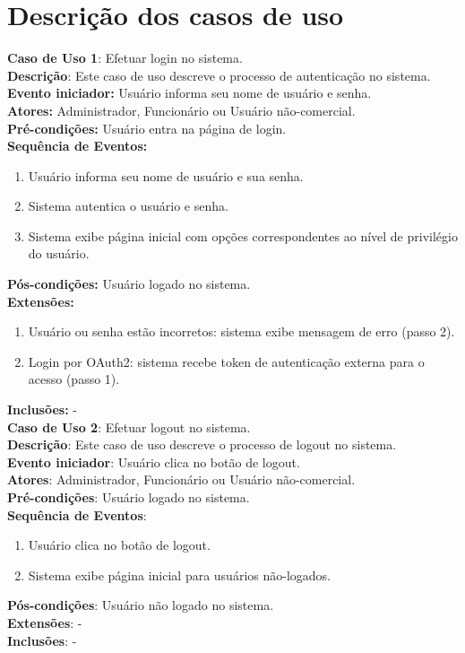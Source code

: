 \documentclass[]{politex}
\begin{document}
\section{Descrição dos casos de uso}

\noindent \textbf{Caso de Uso 1}: Efetuar login no sistema. \\
\textbf{Descrição}: Este caso de uso descreve o processo de autenticação no sistema. \\
\textbf{Evento iniciador:} Usuário informa seu nome de usuário e senha. \\
\textbf{Atores:} Administrador, Funcionário ou Usuário não-comercial. \\
\textbf{Pré-condições:} Usuário entra na página de login. \\
\textbf{Sequência de Eventos:}
\begin{enumerate}
\item Usuário informa seu nome de usuário e sua senha.
\item Sistema autentica o usuário e senha.
\item Sistema exibe página inicial com opções correspondentes ao nível de privilégio do usuário.
\end{enumerate}
\textbf{Pós-condições:} Usuário logado no sistema. \\
\textbf{Extensões:} 
\begin{enumerate}
\item Usuário ou senha estão incorretos: sistema exibe mensagem de erro (passo 2).
\item Login por OAuth2: sistema recebe token de autenticação externa para o acesso (passo 1). 
\end{enumerate}
\textbf{Inclusões:} - \\

\noindent \textbf{Caso de Uso 2}: Efetuar logout no sistema. \\
\textbf{Descrição}: Este caso de uso descreve o processo de logout no sistema. \\
\textbf{Evento iniciador}: Usuário clica no botão de logout. \\
\textbf{Atores}: Administrador, Funcionário ou Usuário não-comercial. \\
\textbf{Pré-condições}: Usuário logado no sistema. \\
\textbf{Sequência de Eventos}: 
\begin{enumerate}
\item Usuário clica no botão de logout.
\item Sistema exibe página inicial para usuários não-logados.
\end{enumerate}
\textbf{Pós-condições}: Usuário não logado no sistema. \\
\textbf{Extensões}: - \\
\textbf{Inclusões}: - \\
\end{document}
